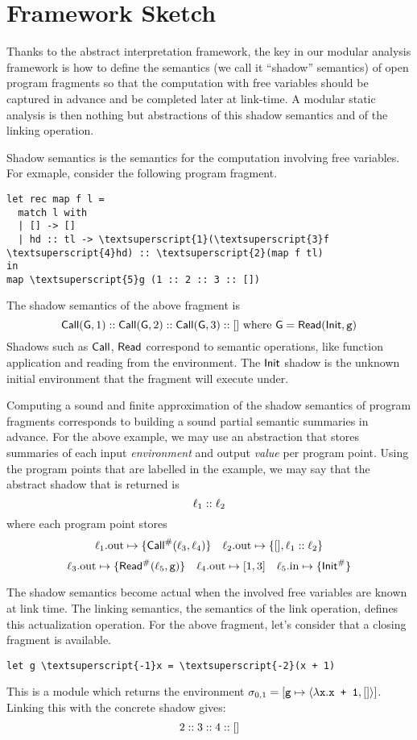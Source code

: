 \documentclass{article}
\begin{document}
\section{Framework Sketch}
Thanks to the abstract interpretation framework, the key in our
modular analysis framework is how to define the semantics (we call it
``shadow'' semantics) of open program fragments so that the
computation with free variables should be captured in advance
and be completed later at link-time. A modular static analysis is
then nothing but abstractions of this shadow semantics and of the
linking operation.

Shadow semantics is the semantics for the computation involving
free variables. For exmaple, consider the following program fragment.
\begin{center}
  \begin{BVerbatim}[commandchars=\\\{\}]
let rec map f l =
  match l with
  | [] -> []
  | hd :: tl -> \textsuperscript{1}(\textsuperscript{3}f \textsuperscript{4}hd) :: \textsuperscript{2}(map f tl)
in
map \textsuperscript{5}g (1 :: 2 :: 3 :: [])
  \end{BVerbatim}
\end{center}
The shadow semantics of the above fragment is
\[\textsf{Call}(\textsf{G},1)::\textsf{Call}(\textsf{G},2)::\textsf{Call}(\textsf{G},3)::[]\text{ where }\textsf{G}=\textsf{Read}(\textsf{Init},\texttt{g})\]
Shadows such as $\textsf{Call}$, $\textsf{Read}$ correspond to semantic operations, like function application and reading from the environment.
The $\textsf{Init}$ shadow is the unknown initial environment that the fragment will execute under.

Computing a sound and finite approximation of the shadow
semantics of program fragments corresponds to building a sound partial
semantic summaries in advance. For the above example,
we may use an abstraction that stores summaries of each input \emph{environment} and output \emph{value} per program point.
Using the program points that are labelled in the example, we may say that the abstract shadow that is returned is
\[\ell_1:: \ell_2\]
where each program point stores
\[
  \ell_1.\text{out}\mapsto\{{\textsf{Call}}^{\#}(\ell_3,\ell_4)\}\quad
  \ell_2.\text{out}\mapsto\{[],\ell_1:: \ell_2\}
\]
\[
  \ell_3.\text{out}\mapsto\{{\textsf{Read}}^{\#}(\ell_5,\texttt{g})\}\quad
  \ell_4.\text{out}\mapsto[1,3]\quad
  \ell_5.\text{in}\mapsto\{{\textsf{Init}}^{\#}\}
\]

The shadow semantics become actual when the involved free variables
are known at link time. The linking semantics, the semantics of the link
operation, defines this actualization operation. For the above fragment, let's
consider that a closing fragment is available.
\begin{center}
  \begin{BVerbatim}[commandchars=\\\{\}]
let g \textsuperscript{-1}x = \textsuperscript{-2}(x + 1)
  \end{BVerbatim}
\end{center}
This is a module which returns the environment $\sigma_{0,1}=[\texttt{g}\mapsto\langle\lambda\texttt{x}.\texttt{x + 1},[]\rangle]$.
Linking this with the concrete shadow gives:
\[2::3::4::[]\]
\end{document}
